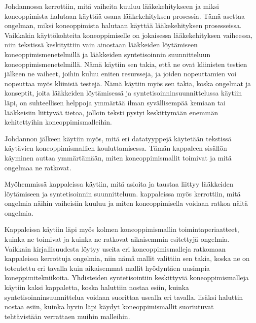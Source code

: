 \documentclass[finnish,twoside,censored,tkt,sw-line]{HYthesisML}
\begin{document}
Johdannossa kerrottiin, mitä vaiheita kuuluu lääkekehitykseen ja miksi koneoppimista halutaan käyttää osana lääkekehityksen prosessia.
Tämä asettaa ongelman, miksi koneoppimista halutaan käyttää lääkekehityksen prosesseissa.
Vaikkakin käyttökohteita koneoppimiselle on jokaisessa lääkekehityksen vaiheessa, niin tekstissä keskityttiin vain ainostaan lääkkeiden löytämiseen koneoppimismenetelmillä ja lääkkeiden syntetisoinnin suunnitteluun koneoppimismenetelmillä.
Nämä käytiin sen takia, että ne ovat kliinisten testien jälkeen ne vaiheet, joihin kuluu eniten resursseja, ja joiden nopeuttamien voi nopeuttaa myös kliinisiä testejä.
Nämä käytiin myös sen takia, koska ongelmat ja konseptit, joita lääkkeiden löytämisessä ja syntetisoinninsuunnittelussa käytiin läpi, on suhteellisen helppoja ymmärtää ilman syvällisempää kemiaan tai lääkkeisiin liittyvää tietoa, jolloin teksti pystyi keskittymään enemmän kehitettyihin koneoppimismalleihin.

Johdannon jälkeen käytiin myös, mitä eri datatyyppejä käytetään tekstissä käytävien koneoppimismallien kouluttamisessa.
Tämän kappaleen sisällön käyminen auttaa ymmärtämään, miten koneoppimismallit toimivat ja mitä ongelmaa ne ratkovat.

Myöhemmissä kappaleissa käytiin, mitä asioita ja taustaa liittyy lääkkeiden löytämiseen ja syntetisoinnin suunnitteluun.
kappaleissa myös kerrottiin, mitä ongelmia näihin vaiheisiin kuuluu ja miten koneoppimisella voidaan ratkoa näitä ongelmia.

Kappaleissa käytiin läpi myös kolmen koneoppimismallin toimintaperiaatteet, kuinka ne toimivat ja kuinka ne ratkovat aikaisemmin esitettyjä ongelmia.
Vaikkain kirjallisuudesta löytyy useita eri koneoppimismalleja ratkomaan kappaleissa kerrottuja ongelmia, niin nämä mallit valittiin sen takia, koska ne on toteutettu eri tavalla kuin aikaisemmat mallit hyödyntäen uusimpia koneppimitekniikoita.
Yhdisteiden syntetisointiin keskittyviä koneoppimismalleja käytiin kaksi kappaletta, koska haluttiin nostaa esiin, kuinka syntetisoinninsuunnittelua voidaan suorittaa usealla eri tavalla.
lisäksi haluttin nostaa esiin, kuinka hyvin läpi käydyt koneoppimismallit suoriutuvat tehtävistään verrattaen muihin malleihin.

\cleardoublepage{}                          %
\printbibliography{}

\backmatter{}
\end{document}
